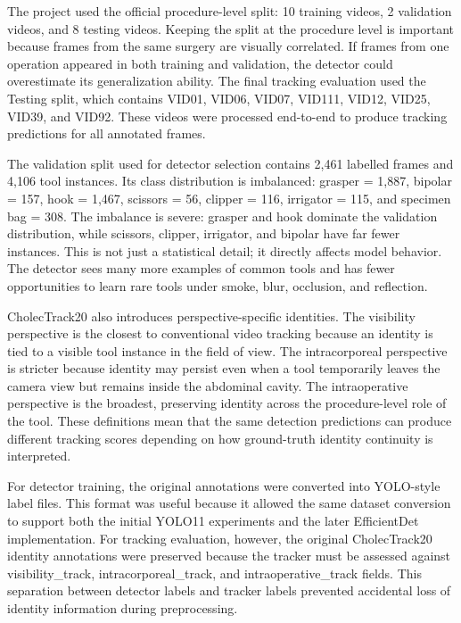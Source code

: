 \documentclass[12pt,a4paper]{article}
\begin{document}
The project used the official procedure-level split: 10 training videos, 2 validation videos, and 8 testing videos. Keeping the split at the procedure level is important because frames from the same surgery are visually correlated. If frames from one operation appeared in both training and validation, the detector could overestimate its generalization ability. The final tracking evaluation used the Testing split, which contains VID01, VID06, VID07, VID111, VID12, VID25, VID39, and VID92. These videos were processed end-to-end to produce tracking predictions for all annotated frames.

The validation split used for detector selection contains 2,461 labelled frames and 4,106 tool instances. Its class distribution is imbalanced: grasper = 1,887, bipolar = 157, hook = 1,467, scissors = 56, clipper = 116, irrigator = 115, and specimen bag = 308. The imbalance is severe: grasper and hook dominate the validation distribution, while scissors, clipper, irrigator, and bipolar have far fewer instances. This is not just a statistical detail; it directly affects model behavior. The detector sees many more examples of common tools and has fewer opportunities to learn rare tools under smoke, blur, occlusion, and reflection.

CholecTrack20 also introduces perspective-specific identities. The visibility perspective is the closest to conventional video tracking because an identity is tied to a visible tool instance in the field of view. The intracorporeal perspective is stricter because identity may persist even when a tool temporarily leaves the camera view but remains inside the abdominal cavity. The intraoperative perspective is the broadest, preserving identity across the procedure-level role of the tool. These definitions mean that the same detection predictions can produce different tracking scores depending on how ground-truth identity continuity is interpreted.

For detector training, the original annotations were converted into YOLO-style label files. This format was useful because it allowed the same dataset conversion to support both the initial YOLO11 experiments and the later EfficientDet implementation. For tracking evaluation, however, the original CholecTrack20 identity annotations were preserved because the tracker must be assessed against visibility\_track, intracorporeal\_track, and intraoperative\_track fields. This separation between detector labels and tracker labels prevented accidental loss of identity information during preprocessing.
\end{document}
